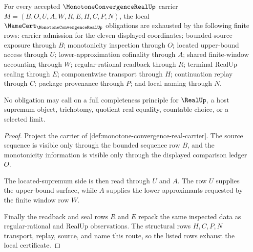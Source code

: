 \begin{theorem}
\label{thm:monotone-convergence-real-namecert-obligations}
For every accepted $\MonotoneConvergenceRealUp$ carrier $M=(B,O,U,A,W,R,E,H,C,P,N)$, the local $\NameCert_{\MonotoneConvergenceRealUp}$ obligations are exhausted by the following finite rows: carrier admission for the eleven displayed coordinates; bounded-source exposure through $B$; monotonicity inspection through $O$; located upper-bound access through $U$; lower-approximation cofinality through $A$; shared finite-window accounting through $W$; regular-rational readback through $R$; terminal RealUp sealing through $E$; componentwise transport through $H$; continuation replay through $C$; package provenance through $P$; and local naming through $N$.

No obligation may call on a full completeness principle for $\RealUp$, a host supremum object, trichotomy, quotient real equality, countable choice, or a selected limit.
\end{theorem}
\begin{proof}
Project the carrier of \autoref{def:monotone-convergence-real-carrier}. The source sequence is visible only through the bounded sequence row $B$, and the monotonicity information is visible only through the displayed comparison ledger $O$.

The located-supremum side is then read through $U$ and $A$. The row $U$ supplies the upper-bound surface, while $A$ supplies the lower approximants requested by the finite window row $W$.

Finally the readback and seal rows $R$ and $E$ repack the same inspected data as regular-rational and RealUp observations. The structural rows $H,C,P,N$ transport, replay, source, and name this route, so the listed rows exhaust the local certificate.
\end{proof}

